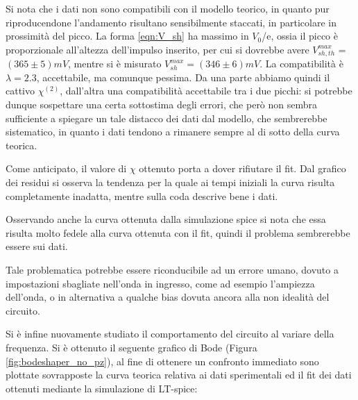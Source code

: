 \documentclass{article}
\begin{document}
Si nota che i dati non sono compatibili con il modello teorico, in quanto pur riproducendone l'andamento risultano sensibilmente 
staccati, in particolare in prossimità del picco. La forma \ref{eqn:V_sh} ha massimo in $V_0$/e, ossia il picco è proporzionale all'altezza dell'impulso
inserito, per cui si dovrebbe avere $V_{sh,th}^{max}$ = $(365 \pm 5) mV $, mentre si è misurato  $V_{sh}^{max}=(346 \pm 6)mV$. La compatibilità è $\lambda=2.3$,
accettabile, ma comunque pessima. Da una parte abbiamo quindi il cattivo $\chi^{(2)}$, dall'altra una compatibilità accettabile tra i due picchi: si potrebbe dunque 
sospettare una certa sottostima degli errori, che però non sembra sufficiente a spiegare un tale distacco dei dati dal modello, che sembrerebbe 
sistematico, in quanto i dati tendono a rimanere sempre al di sotto della curva teorica.



Come anticipato, il valore di $\chi$ ottenuto porta a dover rifiutare il 
fit. Dal grafico dei residui si osserva la tendenza per la quale 
ai tempi iniziali la curva risulta completamente inadatta, mentre sulla coda descrive bene
i dati.

Osservando anche la curva ottenuta dalla simulazione spice si nota che 
essa risulta molto fedele alla curva ottenuta con il fit, quindi il problema
sembrerebbe essere sui dati.

Tale problematica potrebbe essere riconducibile ad un errore umano, dovuto a impostazioni sbagliate nell'onda in ingresso,
come ad esempio l'ampiezza dell'onda, o in alternativa
a qualche bias dovuta ancora alla non idealità del circuito.
 
\medskip

Si è infine nuovamente studiato il comportamento del circuito al variare della frequenza. Si è 
ottenuto il seguente grafico di Bode (Figura \ref{fig:bodeshaper_no_pz}), al fine di ottenere un confronto immediato sono plottate 
sovrapposte la curva teorica relativa ai dati sperimentali ed il fit dei dati ottenuti mediante la simulazione di LT-spice:
\end{document}
